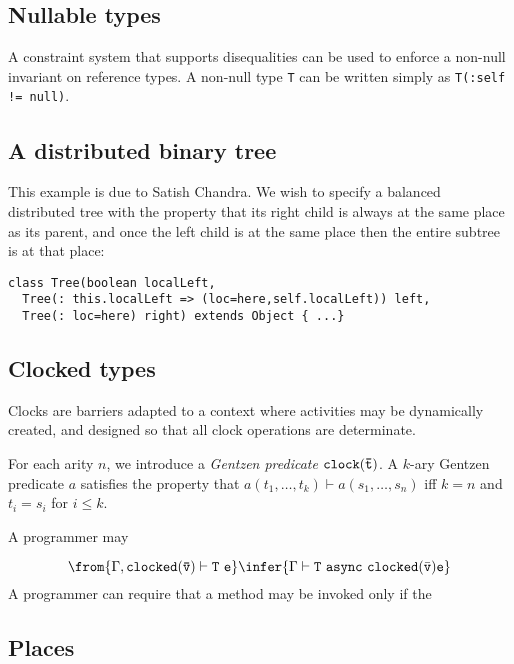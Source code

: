 \subsection{Nullable types}

A constraint system that supports disequalities can be used to
enforce a non-null invariant on reference types.
A non-null type {\tt T} can be written simply as {\tt T(:self != null)}.


\subsection{A distributed binary tree}
This example is due to Satish Chandra. We wish to specify a balanced
distributed tree with the property that its right child is always at
the same place as its parent, and once the left child is at the same
place then the entire subtree is at that place:

{\footnotesize
\begin{verbatim}
class Tree(boolean localLeft,
  Tree(: this.localLeft => (loc=here,self.localLeft)) left, 
  Tree(: loc=here) right) extends Object { ...}
\end{verbatim}}

\subsection{Clocked types}
Clocks are barriers adapted to a context where activities may be
dynamically created, and designed so that all clock operations are
determinate.

For each arity $n$, we introduce a {\em Gentzen predicate} ${\tt
clock(\bar{t})}$. A $k$-ary Gentzen predicate $a$ satisfies the
property that $a(t_1,\ldots, t_k) \vdash a(s_1,\ldots,s_n)$ iff $k=n$
and $t_i=s_i$ for $i\leq k$.

A programmer may

$$
\from{\Gamma, {\tt clocked(\bar{\tt v})} \vdash {\tt T}\ {\tt e}}
\infer{\Gamma \vdash {\tt T}\ {\tt async}\ {\tt clocked}(\bar{\tt v}) {\tt e}}
$$
A programmer can require that a method may be invoked only if the 

\subsection{Places}

% 


